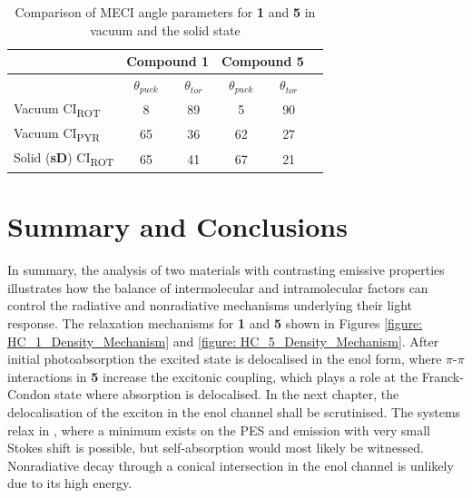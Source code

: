 \begin{table}
  \centering
  \caption[Comparison of MECI angle parameters]{Comparison of MECI angle parameters for \textbf{1} and \textbf{5} in vacuum and the solid state} 
  \label{table: conical_parameters}
  \begin{tabular}{lccccc}
  \hline
  & \multicolumn{2}{c}{Compound \textbf{1}} & \multicolumn{2}{c}{Compound \textbf{5}}\\
  \hline
  & $\theta_{puck}$ & $\theta_{tor}$ & $\theta_{puck}$ & $\theta_{tor}$ \\
  \hline
  Vacuum CI\textsubscript{ROT} & 8\textdegree{} & 89\textdegree{} & 5\textdegree{} & 90\textdegree{}\\
  Vacuum CI\textsubscript{PYR} & 65\textdegree{} & 36\textdegree{} & 62\textdegree{} & 27\textdegree{}\\
  Solid (\textbf{sD}) CI\textsubscript{ROT} & 65\textdegree{} & 41\textdegree{} & 67\textdegree{}&21\textdegree{}\\
  \hline
  \end{tabular}
\end{table}

\section{Summary and Conclusions}\label{section: Inter_conclusions}

In summary, the analysis of two materials with contrasting emissive properties illustrates how the balance of intermolecular and intramolecular factors can control the radiative and nonradiative mechanisms underlying their light response. The relaxation mechanisms for \textbf{1} and \textbf{5} shown in Figures \ref{figure: HC_1_Density_Mechanism} and \ref{figure: HC_5_Density_Mechanism}. After initial photoabsorption the excited state is delocalised in the enol form, where $\pi$-$\pi$ interactions in \textbf{5} increase the excitonic coupling, which plays a role at the Franck-Condon state where absorption is delocalised. In the next chapter, the delocalisation of the exciton in the enol channel shall be scrutinised. The systems relax in \Estar{}, where a minimum exists on the PES and emission with very small Stokes shift is possible, but self-absorption would most likely be witnessed. Nonradiative decay through a conical intersection in the enol channel is unlikely due to its high energy. 

